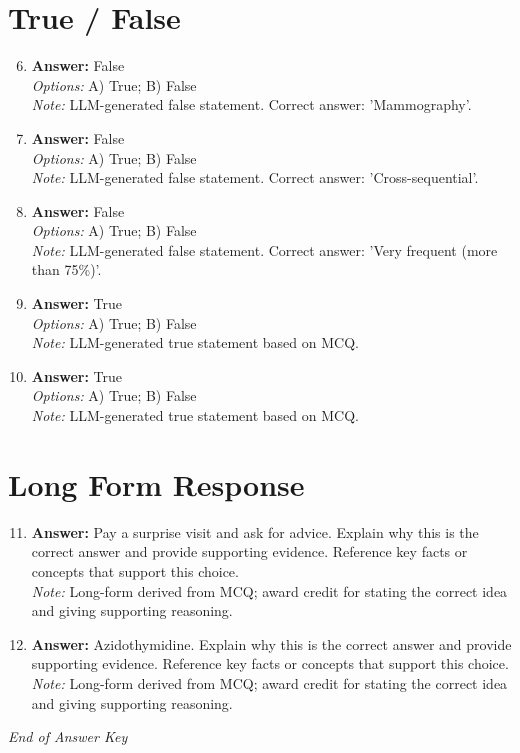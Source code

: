 \documentclass[12pt]{article}
\begin{document}
\section*{True / False}
\begin{enumerate}[label=\arabic*.]
\setcounter{enumi}{5}
\item \textbf{Answer:} False
\\ \textit{Options:} A) True; B) False
\\ \textit{Note:} LLM-generated false statement. Correct answer: 'Mammography'.
\item \textbf{Answer:} False
\\ \textit{Options:} A) True; B) False
\\ \textit{Note:} LLM-generated false statement. Correct answer: 'Cross-sequential'.
\item \textbf{Answer:} False
\\ \textit{Options:} A) True; B) False
\\ \textit{Note:} LLM-generated false statement. Correct answer: 'Very frequent (more than 75\%)'.
\item \textbf{Answer:} True
\\ \textit{Options:} A) True; B) False
\\ \textit{Note:} LLM-generated true statement based on MCQ.
\item \textbf{Answer:} True
\\ \textit{Options:} A) True; B) False
\\ \textit{Note:} LLM-generated true statement based on MCQ.
\end{enumerate}

\section*{Long Form Response}
\begin{enumerate}[label=\arabic*.]
\setcounter{enumi}{10}
\item \textbf{Answer:} Pay a surprise visit and ask for advice. Explain why this is the correct answer and provide supporting evidence. Reference key facts or concepts that support this choice.
\\ \textit{Note:} Long-form derived from MCQ; award credit for stating the correct idea and giving supporting reasoning.
\item \textbf{Answer:} Azidothymidine. Explain why this is the correct answer and provide supporting evidence. Reference key facts or concepts that support this choice.
\\ \textit{Note:} Long-form derived from MCQ; award credit for stating the correct idea and giving supporting reasoning.
\end{enumerate}

\vfill
\noindent\textit{End of Answer Key}
\end{document}
